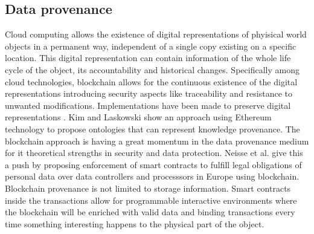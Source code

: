 \subsection{Data provenance}
Cloud computing allows the existence of digital representations of phyisical world objects in a permanent way, independent of a single copy existing on a specific location. This digital representation can contain information of the whole life cycle of the object, its accountability and historical changes. Specifically among cloud technologies, blockchain allows for the continuous existence of the digital representations introducing security aspects like traceability and resistance to unwanted modifications. Implementations have been made to preserve digital representations \cite{provchain}. Kim and Laskowski\cite{ontology} show an approach using Ethereum technology to propose ontologies that can represent knowledge provenance. The blockchain approach is having a great momentum in the data provenance medium for it theoretical strengths in security and data protection. Neisse et al. \cite{europe} give this a push by proposing enforcement of smart contracts to fulfill legal obligations of personal data over data controllers and processsors in Europe using blockchain. Blockchain provenance is not limited to storage information. Smart contracts inside the transactions allow for programmable interactive environments \cite{ramachandran} where the blockchain will be enriched with valid data and binding transactions every time something interesting happens to the physical part of the object.
